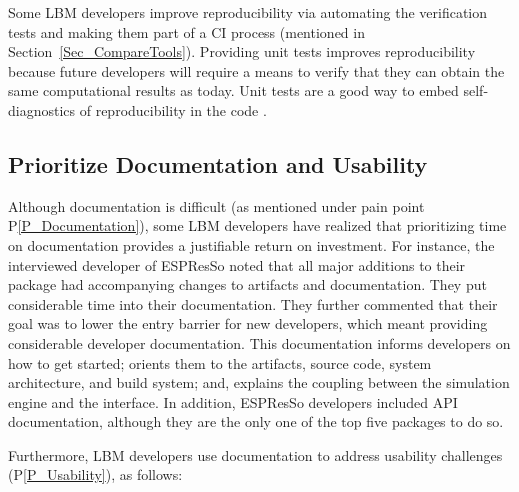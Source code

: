 \documentclass[final, 3p, times, authoryear]{elsarticle}
\newcommand{\ppref}[1]{P\ref{#1}}
\begin{document}
Some LBM developers improve reproducibility via automating the verification
tests and making them part of a CI process (mentioned in
Section~\ref{Sec_CompareTools}).  Providing unit tests improves reproducibility
because future developers will require a means to verify that they can obtain
the same computational results as today.  Unit tests are a good way to embed
self-diagnostics of reproducibility in the code \citep{BenureauAndRougier2017}.

\subsection{Prioritize Documentation and Usability} \label{Sec_RecommendDoc}

Although documentation is difficult (as mentioned under pain point
\ppref{P_Documentation}), some LBM developers have realized that prioritizing
time on documentation provides a justifiable return on investment. For instance,
the interviewed developer of ESPResSo noted that all major additions to their
package had accompanying changes to artifacts and documentation. They put
considerable time into their documentation. They further commented that their
goal was to lower the entry barrier for new developers, which meant providing
considerable developer documentation. This documentation informs developers on
how to get started; orients them to the artifacts, source code, system
architecture, and build system; and, explains the coupling between the
simulation engine and the interface. In addition, ESPResSo developers included
API documentation, although they are the only one of the top five packages to do
so.

Furthermore, LBM developers use documentation to address usability challenges
(\ppref{P_Usability}), as follows:
\end{document}
